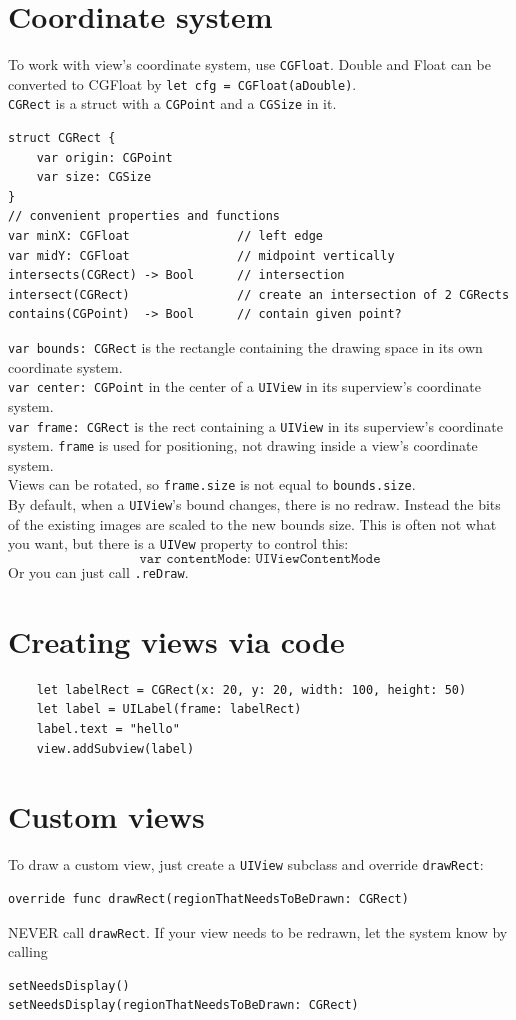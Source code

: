 \documentclass[12pt]{report}
\newcommand{\co}{\texttt}
\begin{document}
\section{Coordinate system}
To work with view's coordinate system, use \co{CGFloat}. Double and Float can be converted to CGFloat by \co{let cfg = CGFloat(aDouble)}.\\
\co{CGRect} is a struct with a \co{CGPoint} and a \co{CGSize} in it.
\begin{lstlisting}
struct CGRect {
	var origin: CGPoint
	var size: CGSize
}
// convenient properties and functions
var minX: CGFloat				// left edge
var midY: CGFloat				// midpoint vertically
intersects(CGRect) -> Bool 		// intersection
intersect(CGRect)				// create an intersection of 2 CGRects
contains(CGPoint)  -> Bool 		// contain given point?
\end{lstlisting}
\co{var bounds: CGRect} is the rectangle containing the drawing space in its own coordinate system.\\
\co{var center: CGPoint} in the center of a \co{UIView} in its superview's coordinate system.\\
\co{var frame: CGRect} is the rect containing a \co{UIView} in its superview's coordinate system. \co{frame} is used for positioning, not drawing inside a view's coordinate system.\\
Views can be rotated, so \co{frame.size} is not equal to \co{bounds.size}. \\
By default, when a \co{UIView}'s bound changes, there is no redraw. Instead the bits of the existing images are scaled to the new bounds size. This is often not what you want, but there is a \co{UIVew} property to control this: $$\co{var contentMode: UIViewContentMode}$$
Or you can just call \co{.reDraw}.


\section{Creating views via code}
\begin{lstlisting}
	let labelRect = CGRect(x: 20, y: 20, width: 100, height: 50)
	let label = UILabel(frame: labelRect)
	label.text = "hello"
	view.addSubview(label)
\end{lstlisting}


\section{Custom views}
To draw a custom view, just create a \co{UIView} subclass and override \co{drawRect}: 
\begin{lstlisting}
override func drawRect(regionThatNeedsToBeDrawn: CGRect)
\end{lstlisting}
NEVER call \co{drawRect}. If your view needs to be redrawn, let the system know by calling 
\begin{lstlisting}
setNeedsDisplay()
setNeedsDisplay(regionThatNeedsToBeDrawn: CGRect)
\end{lstlisting}
\end{document}
